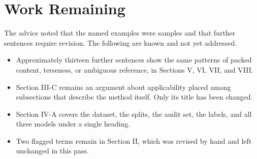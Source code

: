 \documentclass[11pt,a4paper]{article}
\begin{document}
\section{Work Remaining}
The advice noted that the named examples were samples and that further sentences
require revision. The following are known and not yet addressed.

\begin{itemize}[leftmargin=*]
\item Approximately thirteen further sentences show the same patterns of packed
content, terseness, or ambiguous reference, in Sections V, VI, VII, and VIII.
\item Section III-C remains an argument about applicability placed among
subsections that describe the method itself. Only its title has been changed.
\item Section IV-A covers the dataset, the splits, the audit set, the labels, and
all three models under a single heading.
\item Two flagged terms remain in Section II, which was revised by hand and left
unchanged in this pass.
\end{itemize}
\end{document}
